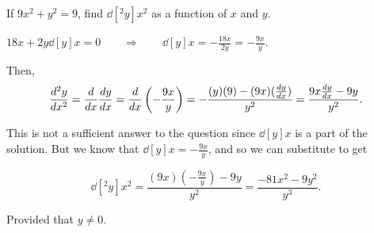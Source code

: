 \documentclass[nooutcomes]{ximera}
\begin{document}
	
	
	
	
	
	
	
			
			

\begin{problem}
If $9x^2 + y^2 = 9$, find $\dd[^2 y]{x^2}$ as a function of $x$ and $y$.
		\begin{freeResponse}
		$18x + 2y \dd[y]{x} = 0 \qquad \Longrightarrow \qquad \dd[y]{x} = - \frac{18x}{2y} = - \frac{9x}{y}$.
		
		Then,
		$$ \dd[^2y]{x^2} = \ddx \dd[y]{x} = \ddx \left( - \frac{9x}{y} \right) = - \frac{(y)(9) - (9x)(\dd[y]{x} )}{y^2} = \frac{9x\dd[y]{x} - 9y}{y^2}. $$
		
		This is not a sufficient answer to the question since $\dd[y]{x}$ is a part of the solution.  But we know that $\dd[y]{x} = -\frac{9x}{y}$, and so we can substitute to get
		
		$$ \dd[^2y]{x^2} = \frac{(9x) \left(- \frac{9x}{y} \right) - 9y}{y^2} = \frac{-81x^2 - 9y^2}{y^3}. $$
		
		Provided that $y \neq 0$.  
		\end{freeResponse}
		
		
		
	
		
\end{problem}
















	
	
	
	
	
	
	
	
	

	










								
				
				
	
\end{document}
